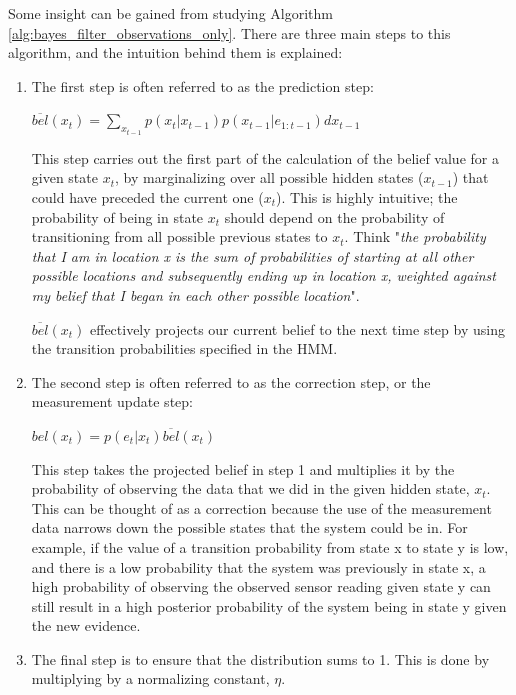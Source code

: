 Some insight can be gained from studying Algorithm \ref{alg:bayes_filter_observations_only}. There are three main steps to this algorithm, and the intuition behind them is explained: 
\begin{enumerate}
    
    \item The first step is often referred to as the prediction step:
    \begin{center}
    $\overline{bel}(x_t) = \sum_{x_{t-1}} p(x_t | x_{t-1}) p(x_{t-1} | e_{1:t-1}) d x_{t-1}$
    \end{center}

    This step carries out the first part of the calculation of the belief value for a given state $x_t$, by marginalizing over all possible hidden states ($x_{t-1}$) that could have preceded the current one ($x_t$). This is highly intuitive; the probability of being in state $x_t$ should depend on the probability of transitioning from all possible previous states to $x_t$. 
    Think "\textit{the probability that I am in location x is the sum of probabilities of starting at all other possible locations and subsequently ending up in location x, weighted against my belief that I began in each other possible location}".
    
    $\overline{bel}(x_t)$ effectively projects our current belief to the next time step by using the transition probabilities specified in the HMM.
    
    \item The second step is often referred to as the correction step, or the measurement update step: 
    \begin{center}
    $bel(x_t) = p(e_t | x_t) \overline{bel}(x_t)$ 
    \end{center}
    This step takes the projected belief in step 1 and multiplies it by the probability of observing the data that we did in the given hidden state, $x_t$. This can be thought of as a correction because the use of the measurement data narrows down the possible states that the system could be in. 
    For example, if the value of a transition probability from state x to state y is low, and there is a low probability that the system was previously in state x, a high probability of observing the observed sensor reading given state y can still result in a high posterior probability of the system being in state y given the new evidence.
    
    \item The final step is to ensure that the distribution sums to 1. This is done by multiplying by a normalizing constant, $\eta$.
    
    
\end{enumerate}

